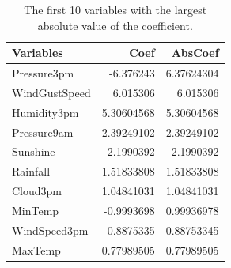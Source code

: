 \documentclass[11pt, a4paper, jou]{apa7}
\begin{document}
\begin{table}[p]
\centering
\caption{The first 10 variables with the largest absolute value of the coefficient. }
\label{tab:rank_coef}
\begin{tabular}{lrr}
    \hline
    Variables     & Coef       & AbsCoef    \\ \hline
    Pressure3pm   & -6.376243  & 6.37624304 \\
    WindGustSpeed & 6.015306   & 6.015306   \\
    Humidity3pm   & 5.30604568 & 5.30604568 \\
    Pressure9am   & 2.39249102 & 2.39249102 \\
    Sunshine      & -2.1990392 & 2.1990392  \\
    Rainfall      & 1.51833808 & 1.51833808 \\
    Cloud3pm      & 1.04841031 & 1.04841031 \\
    MinTemp       & -0.9993698 & 0.99936978 \\
    WindSpeed3pm  & -0.8875335 & 0.88753345 \\
    MaxTemp       & 0.77989505 & 0.77989505 \\ \hline
    \end{tabular}
\end{table}
\end{document}
